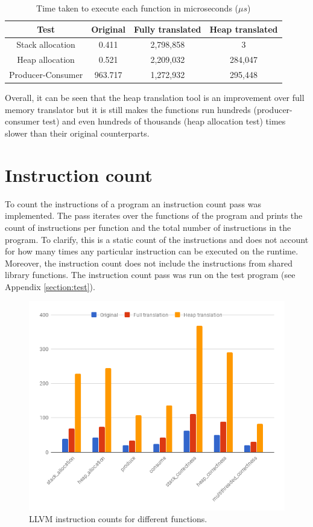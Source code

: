 \documentclass[bsc,frontabs,twoside,singlespacing,parskip,deptreport]{infthesis}     %
\begin{document}
\begin{table}[h]
\centering
\begin{tabular}{ c | c c c }
Test & Original & Fully translated & Heap translated \\
\hline
Stack allocation & 0.411 & 2,798,858 & 3 \\
Heap allocation & 0.521 & 2,209,032 & 284,047 \\
Producer-Consumer & 963.717 & 1,272,932 & 295,448
\end{tabular}
\caption{Time taken to execute each function in microseconds ($\mu s$)}
\label{table:performance}
\end{table}

Overall, it can be seen that the heap translation tool is an improvement over full memory translator but it is still makes the functions run hundreds (producer-consumer test) and even hundreds of thousands (heap allocation test) times slower than their original counterparts.

\section{Instruction count}

To count the instructions of a program an instruction count pass was implemented. The pass iterates over the functions of the program and prints the count of instructions per function and the total number of instructions in the program. To clarify, this is a static count of the instructions and does not account for how many times any particular instruction can be executed on the runtime. Moreover, the instruction count does not include the instructions from shared library functions. The instruction count pass was run on the test program (see Appendix \ref{section:test}).

\begin{figure}[H]
\centering
\includegraphics[width=1\textwidth]{images/instruction_count}
\caption{LLVM instruction counts for different functions.}
\label{fig:instruction_count}
\end{figure}
\end{document}
